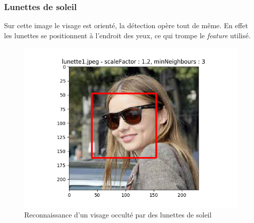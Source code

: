\documentclass[a4paper,11pt]{article}
\begin{document}
	\subsubsection{Lunettes de soleil}

	    Sur cette image le visage est orienté, la détection opère tout de même. En effet les
	    lunettes se positionnent à l'endroit des yeux, ce qui trompe le \textit{feature}
	    utilisé.

	    \begin{figure}[H]
	        \begin{center}
	    	\includegraphics[scale = 0.6]{images/lunette1_1,2_3.png}
	    	\caption{Reconnaissance d'un visage occulté par des lunettes de soleil}
	    	\label{fig:lunette}
	        \end{center}
	    \end{figure}
\end{document}
